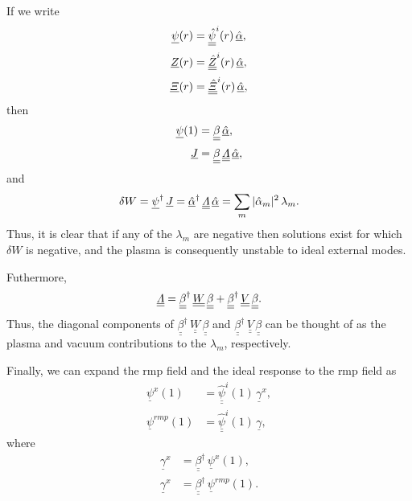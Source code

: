 \documentclass[12pt,prb,aps,notitlepage]{revtex4-1}
\begin{document}
If we write
\begin{align}
\underline{\psi}(r)&= \underline{\underline{\hat{\psi}}}^i(r)\,\underline{\hat{\alpha}},\\[0.5ex]
\underline{Z}(r)&= \underline{\underline{\hat{Z}}}^i(r)\,\underline{\hat{\alpha}},\\[0.5ex]
\underline{{\mit\Xi}}(r)&= \underline{\underline{\hat{\mit\Xi}}}^i(r)\,\underline{\hat{\alpha}},
\end{align}
then
\begin{align}
\underline{\psi}(1) &=\underline{\underline{\beta}}\,\underline{\hat{\alpha}},\\[0.5ex]
\underline{J} &=\underline{\underline{\beta}}\,\underline{\underline{\mit\Lambda}}\,\underline{\hat{\alpha}},
\end{align}
and 
\begin{equation}
 \delta W= \underline{\psi}^\dag\,\underline{J}=\underline{\hat{\alpha}}^\dag\,\underline{\underline{{\mit\Lambda}}}\,\underline{\hat{\alpha}}= \sum_m |\hat{\alpha}_m|^2\,\lambda_m.
 \end{equation}
Thus, it is clear that if any of the $\lambda_m$ are negative then solutions exist for which $\delta W$ is negative, and the plasma
is consequently unstable to ideal external modes.

 Futhermore,
\begin{equation}
\underline{\underline{{\mit\Lambda}}}=\underline{\underline{\beta}}^\dag\,\underline{\underline{W}}\,\underline{\underline{\beta}}
+\underline{\underline{\beta}}^\dag\,\underline{\underline{V}}\,\underline{\underline{\beta}}.
\end{equation}
Thus, the diagonal components of $\underline{\underline{\beta}}^\dag\,\underline{\underline{W}}\,\underline{\underline{\beta}}$ and 
$\underline{\underline{\beta}}^\dag\,\underline{\underline{V}}\,\underline{\underline{\beta}}$ can be thought of as the
plasma and vacuum contributions to the $\lambda_m$, respectively. 

Finally, we can expand the rmp field and the ideal response to the rmp field as
\begin{align}
\underline{\psi}^x(1) &=\underline{\underline{\hat{\psi}}}^i(1)\,\underline{\gamma}^x,\\[0.5ex]
\underline{\psi}^{rmp}(1) &=\underline{\underline{\hat{\psi}}}^i(1)\,\underline{\gamma},
\end{align}
where 
\begin{align}
\underline{\gamma}^x&= \underline{\underline{\beta}}^\dag\,\underline{\psi}^x(1),\\[0.5ex]
\underline{\gamma}^x&= \underline{\underline{\beta}}^\dag\,\underline{\psi}^{rmp}(1).
\end{align}
\end{document}
